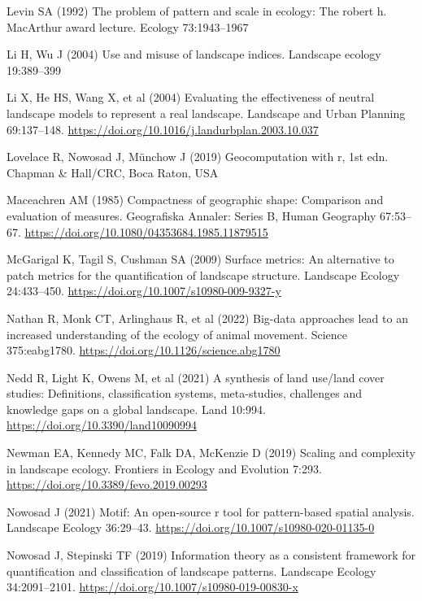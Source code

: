 \documentclass[
  10pt,
  a4paperpaper,
]{article}
\newlength{\cslhangindent}
\newenvironment{CSLReferences}[2] %
 {\begin{list}{}{%
  \setlength{\itemindent}{0pt}
  \setlength{\leftmargin}{0pt}
  \setlength{\parsep}{0pt}
  \ifodd #1
   \setlength{\leftmargin}{\cslhangindent}
   \setlength{\itemindent}{-1\cslhangindent}
  \fi
  \setlength{\itemsep}{#2\baselineskip}}}
 {\end{list}}
\begin{document}
\begin{CSLReferences}{1}{1}
Levin SA (1992) The problem of pattern and scale in ecology: The robert
h. MacArthur award lecture. Ecology 73:1943--1967

Li H, Wu J (2004) Use and misuse of landscape indices. Landscape ecology
19:389--399

Li X, He HS, Wang X, et al (2004) Evaluating the effectiveness of
neutral landscape models to represent a real landscape. Landscape and
Urban Planning 69:137--148.
\url{https://doi.org/10.1016/j.landurbplan.2003.10.037}

Lovelace R, Nowosad J, Münchow J (2019) Geocomputation with r, 1st edn.
Chapman \& Hall/CRC, Boca Raton, USA

Maceachren AM (1985) Compactness of geographic shape: Comparison and
evaluation of measures. Geografiska Annaler: Series B, Human Geography
67:53--67. \url{https://doi.org/10.1080/04353684.1985.11879515}

McGarigal K, Tagil S, Cushman SA (2009) Surface metrics: An alternative
to patch metrics for the quantification of landscape structure.
Landscape Ecology 24:433--450.
\url{https://doi.org/10.1007/s10980-009-9327-y}

Nathan R, Monk CT, Arlinghaus R, et al (2022) Big-data approaches lead
to an increased understanding of the ecology of animal movement. Science
375:eabg1780. \url{https://doi.org/10.1126/science.abg1780}

Nedd R, Light K, Owens M, et al (2021) A synthesis of land use/land
cover studies: Definitions, classification systems, meta-studies,
challenges and knowledge gaps on a global landscape. Land 10:994.
\url{https://doi.org/10.3390/land10090994}

Newman EA, Kennedy MC, Falk DA, McKenzie D (2019) Scaling and complexity
in landscape ecology. Frontiers in Ecology and Evolution 7:293.
\url{https://doi.org/10.3389/fevo.2019.00293}

Nowosad J (2021) Motif: An open-source r tool for pattern-based spatial
analysis. Landscape Ecology 36:29--43.
\url{https://doi.org/10.1007/s10980-020-01135-0}

Nowosad J, Stepinski TF (2019) Information theory as a consistent
framework for quantification and classification of landscape patterns.
Landscape Ecology 34:2091--2101.
\url{https://doi.org/10.1007/s10980-019-00830-x}


\end{CSLReferences}
\end{document}
